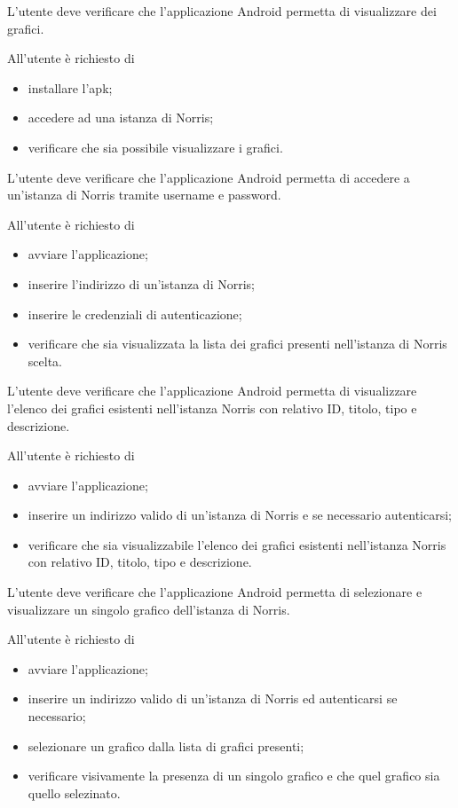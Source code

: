 	L'utente deve verificare che l'applicazione Android permetta di visualizzare dei grafici.

		All'utente è richiesto di
		\begin{itemize}
			\item installare l'apk;
			\item accedere ad una istanza di Norris;
			\item verificare che sia possibile visualizzare i grafici.
		\end{itemize}

	L'utente deve verificare che l'applicazione Android permetta di accedere a un'istanza di Norris tramite username e password.

		All'utente è richiesto di
		\begin{itemize}
			\item avviare l'applicazione;
			\item inserire l'indirizzo di un'istanza di Norris;
			\item inserire le credenziali di autenticazione;
			\item verificare che sia visualizzata la lista dei grafici presenti nell'istanza di Norris scelta.
		\end{itemize}

	L'utente deve verificare che l'applicazione Android permetta di visualizzare l'elenco dei grafici esistenti nell'istanza Norris con relativo ID, titolo, tipo e descrizione.

		All'utente è richiesto di
		\begin{itemize}
			\item avviare l'applicazione;
			\item inserire un indirizzo valido di un'istanza di Norris e se necessario autenticarsi;
			\item verificare che sia visualizzabile l'elenco dei grafici esistenti nell'istanza Norris con relativo ID, titolo, tipo e descrizione.
		\end{itemize}

	L'utente deve verificare che l'applicazione Android permetta di selezionare e visualizzare un singolo grafico dell'istanza di Norris.

		All'utente è richiesto di
		\begin{itemize}
			\item avviare l'applicazione;
			\item inserire un indirizzo valido di un'istanza di Norris ed autenticarsi se necessario;
			\item selezionare un grafico dalla lista di grafici presenti;
			\item verificare visivamente la presenza di un singolo grafico e che quel grafico sia quello selezinato.
		\end{itemize}

